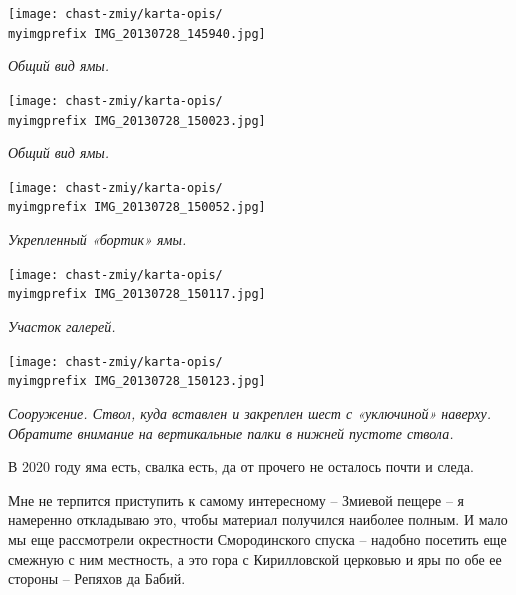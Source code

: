 \begin{center}
\texttt{[image: chast-zmiy/karta-opis/\\myimgprefix IMG\_20130728\_145940.jpg]}

\textit{Общий вид ямы.}
\end{center}

\newpage

\begin{center}
\texttt{[image: chast-zmiy/karta-opis/\\myimgprefix IMG\_20130728\_150023.jpg]}

\textit{Общий вид ямы.}
\end{center}

\begin{center}
\texttt{[image: chast-zmiy/karta-opis/\\myimgprefix IMG\_20130728\_150052.jpg]}

\textit{Укрепленный «бортик» ямы.}
\end{center}

\newpage
\vspace*{\fill}

\begin{center}
\texttt{[image: chast-zmiy/karta-opis/\\myimgprefix IMG\_20130728\_150117.jpg]}

\textit{Участок галерей.}
\end{center}
\vspace*{\fill}
\newpage

\vspace*{\fill}
\begin{center}
\texttt{[image: chast-zmiy/karta-opis/\\myimgprefix IMG\_20130728\_150123.jpg]}

\textit{Сооружение. Ствол, куда вставлен и закреплен шест с «уключиной» наверху. Обратите внимание на вертикальные палки в нижней пустоте ствола.}
\end{center}
\vspace*{\fill}
\newpage

В 2020 году яма есть, свалка есть, да от прочего не осталось почти и следа.

Мне не терпится приступить к самому интересному – Змиевой пещере – я намеренно откладываю это, чтобы материал получился наиболее полным. И мало мы еще рассмотрели окрестности Смородинского спуска – надобно посетить еще смежную с ним местность, а это гора с Кирилловской церковью и яры по обе ее стороны – Репяхов да Бабий.
